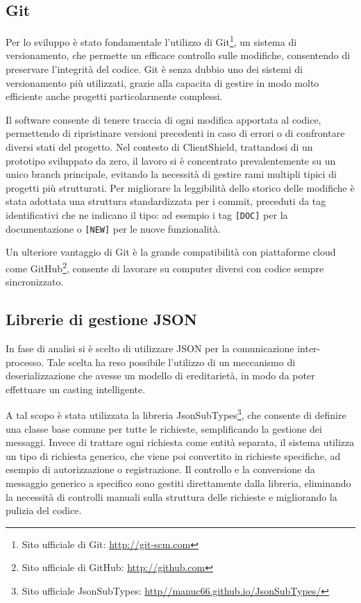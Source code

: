 \documentclass[12pt,a4paper,openright,twoside]{book}
\begin{document}
\subsection*{Git}

Per lo sviluppo è stato fondamentale l'utilizzo di Git\footnote{Sito ufficiale di Git: \url{http://git-scm.com}}, un sistema di versionamento, che permette un efficace controllo sulle modifiche, consentendo di preservare l'integrità del codice.
Git è senza dubbio uno dei sistemi di versionamento più utilizzati, grazie alla capacita di gestire in modo molto efficiente anche progetti particolarmente complessi.

Il software consente di tenere traccia di ogni modifica apportata al codice, permettendo di ripristinare versioni precedenti in caso di errori o di confrontare diversi stati del progetto. Nel contesto di ClientShield, trattandosi di un prototipo sviluppato da zero, il lavoro si è concentrato prevalentemente su un unico branch principale, evitando la necessità di gestire rami multipli tipici di progetti più strutturati.
Per migliorare la leggibilità dello storico delle modifiche è stata adottata una struttura standardizzata per i commit, preceduti da tag identificativi che ne indicano il tipo: ad esempio i tag \texttt{[DOC]} per la documentazione o \texttt{[NEW]} per le nuove funzionalità.

Un ulteriore vantaggio di Git è la grande compatibilità con piattaforme cloud come GitHub\footnote{Sito ufficiale di GitHub: \url{http://github.com}}, consente di lavorare su computer diversi con codice sempre sincronizzato.

\subsection*{Librerie di gestione JSON}

In fase di analisi si è scelto di utilizzare JSON per la comunicazione inter-processo.
Tale scelta ha reso possibile l'utilizzo di un meccanismo di deserializzazione che avesse un modello di ereditarietà, in modo da poter effettuare un casting intelligente.

A tal scopo è stata utilizzata la libreria JsonSubTypes\footnote{Sito ufficiale JsonSubTypes: \url{http//manuc66.github.io/JsonSubTypes/}}, che consente di definire una classe base comune per tutte le richieste, semplificando la gestione dei messaggi.
Invece di trattare ogni richiesta come entità separata, il sistema utilizza un tipo di richiesta generico, che viene poi convertito in richieste specifiche, ad esempio di autorizzazione o registrazione.
Il controllo e la conversione da messaggio generico a specifico sono gestiti direttamente dalla libreria, eliminando la necessità di controlli manuali sulla struttura delle richieste e migliorando la pulizia del codice.
\end{document}
